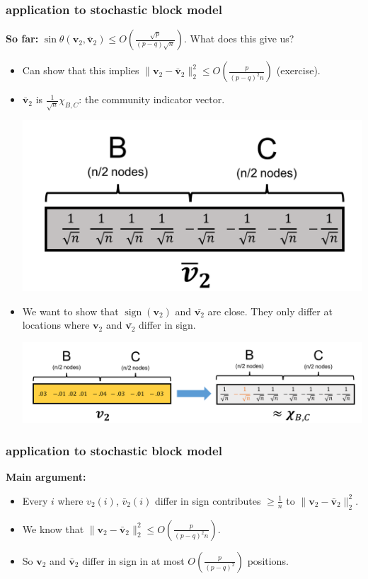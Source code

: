 \documentclass[compress]{beamer}
\newcommand{\bv}[1]{\mathbf{#1}}
\DeclareMathOperator{\sign}{sign}
\newcommand{\norm}[1]{\|#1\|}
\begin{document}
\begin{frame}
	\frametitle{application to stochastic block model}
	\small
	\textbf{So far:} $\sin \theta(\bv{v}_2,\bar{\bv{v}}_2) \le O\left (\frac{\sqrt{p}}{(p-q)\sqrt{n}} \right )$. What does this give us?
	\begin{itemize}
		\item Can show that this implies $\norm{\bv{v}_2 - \bar{\bv{v}}_2}_2^2 \le O\left (\frac{p}{(p-q)^2 n} \right )$ (exercise).
		\item $\bar{\bv{v}}_2$ is $\frac{1}{\sqrt{n}} \chi_{B,C}$: the community  indicator vector.
		\begin{center}
			\vspace{-1.5em}
			\includegraphics[width=.5\textwidth]{v2.png}
				\vspace{-1em}
		\end{center}
		\item We want to show that $\sign(\bv{v}_2)$ and $\bar{\bv{v}_2}$ are close. They only differ at locations where $\bv{v}_2$ and $\bar{\bv{v}_2}$ differ in sign.
			\begin{center}
			\vspace{-2em}
			\includegraphics[width=1\textwidth]{round.png}
		\end{center}
	\end{itemize}
\end{frame}

\begin{frame}
	\frametitle{application to stochastic block model}
	\textbf{Main argument:}
	\begin{itemize}
		\item Every $i$ where $v_2(i)$, $\bar v_2(i)$ \alert{differ in sign} contributes $\ge \frac{1}{n}$ to $\norm{\bv{v}_2 - \bar{\bv{v}}_2}_2^2.$
		\item We know that $\norm{\bv{v}_2 - \bar{\bv{v}}_2}_2^2 \le O\left (\frac{p}{(p-q)^2 n} \right )$.
		\item So $\bv{v}_2$ and $\bar{\bv{v}}_2$ differ in sign in at most $O \left  (\frac{p}{(p-q)^2}\right )$ positions.	\end{itemize}
\end{frame}
\end{document}
